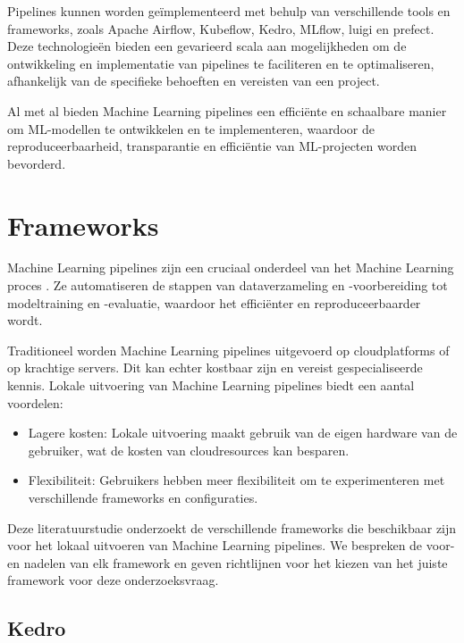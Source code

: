 Pipelines kunnen worden geïmplementeerd met behulp van verschillende tools en frameworks, zoals Apache Airflow, Kubeflow, Kedro, MLflow, luigi en prefect. Deze technologieën bieden een gevarieerd scala aan mogelijkheden om de ontwikkeling en implementatie van pipelines te faciliteren en te optimaliseren, afhankelijk van de specifieke behoeften en vereisten van een project.

Al met al bieden Machine Learning pipelines een efficiënte en schaalbare manier om ML-modellen te ontwikkelen en te implementeren, waardoor de reproduceerbaarheid, transparantie en efficiëntie van ML-projecten worden bevorderd.

\section{Frameworks}

Machine Learning pipelines zijn een cruciaal onderdeel van het Machine Learning proces \autocite{Jordan2015}. Ze automatiseren de stappen van dataverzameling en -voorbereiding tot modeltraining en -evaluatie, waardoor het efficiënter en reproduceerbaarder wordt.

Traditioneel worden Machine Learning pipelines uitgevoerd op cloudplatforms of op krachtige servers. Dit kan echter kostbaar zijn en vereist gespecialiseerde kennis. Lokale uitvoering van Machine Learning pipelines biedt een aantal voordelen:

\begin{itemize}
  \item Lagere kosten: Lokale uitvoering maakt gebruik van de eigen hardware van de gebruiker, wat de kosten van cloudresources kan besparen.
  \item Flexibiliteit: Gebruikers hebben meer flexibiliteit om te experimenteren met verschillende frameworks en configuraties.
\end{itemize}

Deze literatuurstudie onderzoekt de verschillende frameworks die beschikbaar zijn voor het lokaal uitvoeren van Machine Learning pipelines. We bespreken de voor- en nadelen van elk framework en geven richtlijnen voor het kiezen van het juiste framework voor deze onderzoeksvraag.
\subsection{Kedro}


